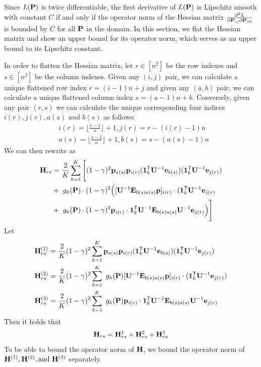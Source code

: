 Since $L(\mathbf{{P}})$ is twice differentiable, the first derivative of $L(\mathbf{{P}})$ is Lipschitz smooth with constant $C$ if and only if the operator norm of the Hessian matrix $ \frac{\partial^2 L}{\partial \mathbf{{P}}_{ij} \partial \mathbf{{P}}_{ab}}$ is bounded by $C$ for all $\mathbf{{P}}$ in the domain.
In this section, we flat the Hessian matrix and show an upper bound for its operator norm, which serves as an upper bound to its Lipschitz constant.

In order to flatten the Hessian matrix, let $r \in [n^2]$ be the row indexes and $s \in [n^2]$ be the column indexes. Given any $(i,j)$ pair, we can calculate a unique flattened row index $r = (i-1)n + j$ and given any $(a,b)$ pair, we can calculate a unique flattened column index $s = (a-1)n + b$. Conversely, given any pair $(r,s)$ we can calculate the unique corresponding four indices $ i(r), j(r), a(s) \textit{ and } b(s)$ as follows:
\begin{align*}
    &i(r) = \lfloor \frac{r-1}{n}\rfloor + 1, j(r) = r - (i(r) -1)n \\
    &a(s) = \lfloor \frac{s-1}{n}\rfloor + 1, b(s) = s - (a(s) -1)n 
\end{align*}
We can then rewrite  as
\begin{align*}
\label{eq:hessian}
     \mathbf{{H}}_{rs}
&= \frac{2}{K} \sum_{k=1}^K \Bigg[
        (1-\gamma)^2 \mathbf{{p}}_{a(s)} \mathbf{{p}}_{i(r)}(\mathbf{{1}}_{k}^{\mathsf{T}} \mathbf{{U}}^{-1} \mathbf{{e}}_{b(s)})(\mathbf{{1}}_{k}^{\mathsf{T}} \mathbf{{U}}^{-1} \mathbf{{e}}_{j(r)})\\ \nonumber
    &+\ g_k(\mathbf{{P}}) \cdot (1-\gamma)^2 \Big(
        [\mathbf{{U}}^{-1} \mathbf{{E}}_{b(s)a(s)} \mathbf{{p}}]_{i(r)} \cdot (\mathbf{{1}}_{k}^{\mathsf{T}} \mathbf{{U}}^{-1} \mathbf{{e}}_{j(r)} \\ \nonumber 
        &+ \ g_k(\mathbf{{P}}) \cdot (1-\gamma)^2 \mathbf{{p}}_{i(r)} \cdot \mathbf{{1}}_{k}^{\mathsf{T}} \mathbf{{U}}^{-1} \mathbf{{E}}_{b(s)a(s)} \mathbf{{U}}^{-1} \mathbf{{e}}_{j(r)}
    \Big)
\Bigg]
\end{align*}
Let 
\begin{align*}
    \mathbf{{H}}_{rs}^{(1)} & = \frac{2}{K} (1-\gamma)^2\sum_{k=1}^K 
         \mathbf{{p}}_{a(s)} \mathbf{{p}}_{i(r)}(\mathbf{{1}}_{k}^{\mathsf{T}} \mathbf{{U}}^{-1} \mathbf{{e}}_{b(s)})(\mathbf{{1}}_{k}^{\mathsf{T}} \mathbf{{U}}^{-1} \mathbf{{e}}_{j(r)}) \\
        \mathbf{{H}}_{rs}^{(2)} & = \frac{2}{K} (1-\gamma)^2\sum_{k=1}^K 
        \ g_k(\mathbf{{P}}) 
        [\mathbf{{U}}^{-1} \mathbf{{E}}_{b(s)a(s)} \mathbf{{p}}]_{i(r)} \cdot (\mathbf{{1}}_{k}^{\mathsf{T}} \mathbf{{U}}^{-1} \mathbf{{e}}_{j(r)}) \\    
        \mathbf{{H}}_{rs}^{(3)} & = \frac{2}{K} (1-\gamma)^2\sum_{k=1}^K 
        \ g_k(\mathbf{{P}})  \mathbf{{p}}_{i(r)} \cdot \mathbf{{1}}_{k}^{\mathsf{T}} \mathbf{{U}}^{-1} \mathbf{{E}}_{b(s)a(s)} \mathbf{{U}}^{-1} \mathbf{{e}}_{j(r)} 
\end{align*}
Then it holds that
\begin{equation*}
     \mathbf{{H}}_{rs} =  \mathbf{{H}}_{rs}^1 +  \mathbf{{H}}_{rs}^2 +  \mathbf{{H}}_{rs}^3
\end{equation*}
To be able to bound the operator norm of $\mathbf{{H}}$, we bound the operator norm of $\mathbf{{H}}^{(1)},  \mathbf{{H}}^{(2)}, \text{and }  \mathbf{{H}}^{(3)}$ separately.


